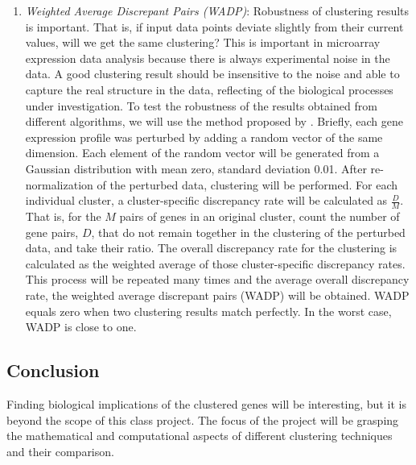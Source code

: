 \documentclass[11pt]{extarticle} %
\begin{document}
\begin{enumerate}
\item {\emph{Weighted Average Discrepant Pairs (WADP)}}: Robustness of clustering results is important. That is, if input data points deviate slightly from their current values, will we get the same clustering? This is important in microarray expression data analysis because there is always experimental noise in the data. A good clustering result should be insensitive
to the noise and able to capture the real structure in the data, reflecting of the biological processes under investigation. To test the robustness of the results obtained from different algorithms, we will use the method proposed by \cite{Bittner_etal_2000_Nature}. Briefly, each gene expression profile was perturbed by adding a random vector of the same dimension. Each element of the random vector will be generated from a Gaussian distribution with mean zero, standard deviation 0.01. After re-normalization of the perturbed data, clustering will be performed. For each individual cluster, a cluster-specific discrepancy rate will be calculated as $\frac{D}{M}$. That is, for the $M$ pairs of genes in an original cluster, count the number of gene pairs, $D$, that do not remain together in the clustering of the perturbed data, and take their ratio. The overall discrepancy rate for the clustering is calculated as the weighted average of those cluster-specific discrepancy rates. This process will be repeated many times and the average overall discrepancy rate, the weighted average discrepant pairs
(WADP) will be obtained. WADP equals zero when two clustering results match perfectly. In the worst case, WADP is close to one.
\end{enumerate}

\subsection*{Conclusion}
Finding biological implications of the clustered genes will be interesting, but it is beyond the scope of this class project. The focus of the project will be grasping the mathematical and computational aspects of different clustering techniques and their comparison. 

\newpage

%
\end{document}

